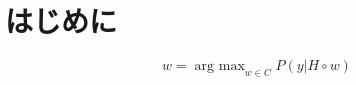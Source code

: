 \documentclass[dvipdfmx]{jsarticle}
\DeclareMathOperator*{\argmax}{arg\ max}
\begin{document}
\title{}
\author{}
\maketitle
\section{はじめに}
\begin{equation}\label{}
w = \argmax_{w \in C} P(y | H \circ w)
\end{equation}

\begin{thebibliography}{}
\item
\end{thebibliography}
\end{document}
